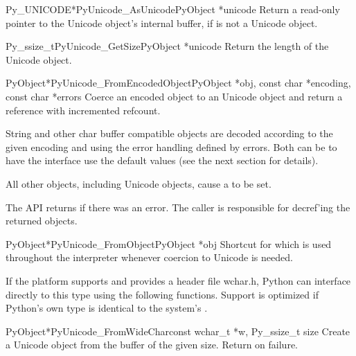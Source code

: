\begin{cfuncdesc}{Py_UNICODE*}{PyUnicode_AsUnicode}{PyObject *unicode}
  Return a read-only pointer to the Unicode object's internal
   buffer, \NULL{} if  is not a Unicode
  object.
\end{cfuncdesc}

\begin{cfuncdesc}{Py_ssize_t}{PyUnicode_GetSize}{PyObject *unicode}
  Return the length of the Unicode object.
\end{cfuncdesc}

\begin{cfuncdesc}{PyObject*}{PyUnicode_FromEncodedObject}{PyObject *obj,
                                                      const char *encoding,
                                                      const char *errors}
  Coerce an encoded object  to an Unicode object and return a
  reference with incremented refcount.
  
  String and other char buffer compatible objects are decoded
  according to the given encoding and using the error handling
  defined by errors.  Both can be \NULL{} to have the interface
  use the default values (see the next section for details).

  All other objects, including Unicode objects, cause a
   to be set.

  The API returns \NULL{} if there was an error.  The caller is
  responsible for decref'ing the returned objects.
\end{cfuncdesc}

\begin{cfuncdesc}{PyObject*}{PyUnicode_FromObject}{PyObject *obj}
  Shortcut for 
  which is used throughout the interpreter whenever coercion to
  Unicode is needed.
\end{cfuncdesc}


If the platform supports  and provides a header file
wchar.h, Python can interface directly to this type using the
following functions. Support is optimized if Python's own
 type is identical to the system's .

\begin{cfuncdesc}{PyObject*}{PyUnicode_FromWideChar}{const wchar_t *w,
                                                     Py_ssize_t size}
  Create a Unicode object from the  buffer  of
  the given size.  Return \NULL{} on failure.
\end{cfuncdesc}

